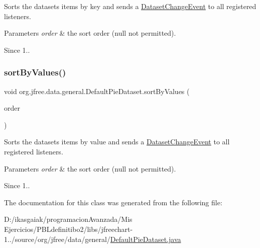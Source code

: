 Sorts the dataset\textquotesingle{}s items by key and sends a \mbox{\hyperlink{classorg_1_1jfree_1_1data_1_1general_1_1_dataset_change_event}{Dataset\+Change\+Event}} to all registered listeners.


\begin{DoxyParams}{Parameters}
{\em order} & the sort order ({\ttfamily null} not permitted).\\
\hline
\end{DoxyParams}
\begin{DoxySince}{Since}
1.. 
\end{DoxySince}
\mbox{\label{classorg_1_1jfree_1_1data_1_1general_1_1_default_pie_dataset_acda5155e8269c5270125dbf6186b0be9}} 
\subsubsection{\texorpdfstring{sort\+By\+Values()}{sortByValues()}}
{\footnotesize\ttfamily void org.\+jfree.\+data.\+general.\+Default\+Pie\+Dataset.\+sort\+By\+Values (\begin{DoxyParamCaption}\item[{Sort\+Order}]{order }\end{DoxyParamCaption})}

Sorts the dataset\textquotesingle{}s items by value and sends a \mbox{\hyperlink{classorg_1_1jfree_1_1data_1_1general_1_1_dataset_change_event}{Dataset\+Change\+Event}} to all registered listeners.


\begin{DoxyParams}{Parameters}
{\em order} & the sort order ({\ttfamily null} not permitted).\\
\hline
\end{DoxyParams}
\begin{DoxySince}{Since}
1.. 
\end{DoxySince}


The documentation for this class was generated from the following file\+:\begin{DoxyCompactItemize}
\item 
D\+:/ikasgaiak/programacion\+Avanzada/\+Mis Ejercicios/\+P\+B\+Ldefinitibo2/libs/jfreechart-\/1../source/org/jfree/data/general/\mbox{\hyperlink{_default_pie_dataset_8java}{Default\+Pie\+Dataset.\+java}}\end{DoxyCompactItemize}
